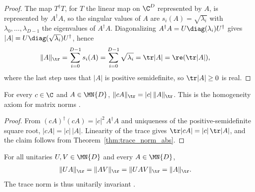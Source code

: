 \begin{proof}\leanok
    The map $T^\dagger T$, for $T$ the linear map on $\C^D$ represented by
    $A$, is represented by $A^\dagger A$, so the singular values of $A$ are
    $s_i(A)=\sqrt{\lambda_i}$ with $\lambda_0,\ldots,\lambda_{D-1}$ the
    eigenvalues of $A^\dagger A$. Diagonalizing
    $A^\dagger A=U\diag(\lambda_i)U^\dagger$ gives
    $\lvert A\rvert=U\diag(\sqrt{\lambda_i})U^\dagger$, hence
    \begin{align}
        \lVert A\rVert_{\tr}
        &=\sum_{i=0}^{D-1}s_i(A)
          =\sum_{i=0}^{D-1}\sqrt{\lambda_i}
          =\tr\lvert A\rvert
          =\re(\tr\lvert A\rvert),
        \notag
    \end{align}
    where the last step uses that $\lvert A\rvert$ is positive semidefinite,
    so $\tr\lvert A\rvert\geq0$ is real.
\end{proof}

\begin{theorem}
    \label{thm:trace_norm_homogeneous}
    \leanok
    For every $c\in\C$ and $A\in\MN{D}$,
    $\lVert cA\rVert_{\tr}
    =\lvert c\rvert\,\lVert A\rVert_{\tr}$.
    This is the homogeneity axiom for matrix norms
    \cite[Chapter~8, Section~8.1]{Wolf2012Quantum}.
\end{theorem}

\begin{proof}\leanok
    From $(cA)^\dagger(cA)=\lvert c\rvert^2\,A^\dagger A$ and uniqueness of
    the positive-semidefinite square root,
    $\lvert cA\rvert=\lvert c\rvert\,\lvert A\rvert$. Linearity of the trace
    gives
    $\tr\lvert cA\rvert
    =\lvert c\rvert\,\tr\lvert A\rvert$, and the claim follows
    from Theorem~\ref{thm:trace_norm_abs}.
\end{proof}

\begin{theorem}
    \label{thm:trace_norm_unitary_invariance}
    \leanok
    For all unitaries $U,V\in\MN{D}$ and every $A\in\MN{D}$,
    \begin{align}
        \lVert UA\rVert_{\tr}
        &=\lVert AV\rVert_{\tr}
          =\lVert UAV\rVert_{\tr}
          =\lVert A\rVert_{\tr}.
        \notag
    \end{align}
    The trace norm is thus unitarily invariant
    \cite[Chapter~8, Section~8.1]{Wolf2012Quantum}.
\end{theorem}

